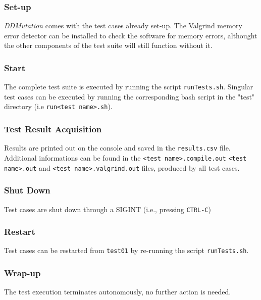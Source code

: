 \subsubsection{Set-up}
\emph{DDMutation} comes with the test cases already set-up.  The Valgrind memory error detector can be installed to check the software for memory errors, althought the other components of the test suite will still function without it.
\subsubsection{Start}
The complete test suite is executed by running the script \texttt{runTests.sh}.
Singular test cases can be executed by running the corresponding bash script in the "test" directory (i.e \texttt{run<test name>.sh}).
\subsubsection{Test Result Acquisition}
Results are printed out on the console and saved in the \texttt{results.csv} file.
Additional informations can be found in the \texttt{<test name>.compile.out} \texttt{<test name>.out} and \texttt{<test name>.valgrind.out} files, produced by all test cases.
\subsubsection{Shut Down}
Test cases are shut down through a SIGINT (i.e., pressing \texttt{CTRL-C})
\subsubsection{Restart}
Test cases can be restarted from \texttt{test01} by re-running the script \texttt{runTests.sh}.
\subsubsection{Wrap-up}
The test execution terminates autonomously, no further action is needed.
